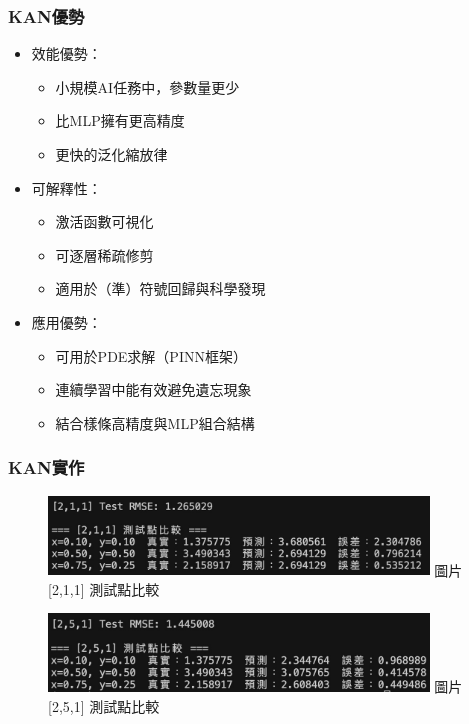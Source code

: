 \documentclass{beamer}
\begin{document}
\begin{frame}
    \frametitle{KAN優勢}
    \begin{itemize}
        \item 效能優勢：
        \begin{itemize}
            \item 小規模AI任務中，參數量更少
            \item 比MLP擁有更高精度
            \item 更快的泛化縮放律
        \end{itemize}
        \item 可解釋性：
        \begin{itemize}
            \item 激活函數可視化
            \item 可逐層稀疏修剪
            \item 適用於（準）符號回歸與科學發現
        \end{itemize}
        \item 應用優勢：
        \begin{itemize}
            \item 可用於PDE求解（PINN框架）
            \item 連續學習中能有效避免遺忘現象
            \item 結合樣條高精度與MLP組合結構
        \end{itemize}
    \end{itemize}
\end{frame}

\begin{frame}
    \frametitle{KAN實作}
    \begin{figure}
        \centering
        \begin{minipage}{\textwidth}
            \includegraphics[width=0.9\textwidth,height=0.4\textheight,keepaspectratio]{figures/211_3.jpg}
            \centering
            圖片[2,1,1] 測試點比較
        \end{minipage}
        
        \vspace{0.5em}
        
        \begin{minipage}{\textwidth}
            \includegraphics[width=0.9\textwidth,height=0.4\textheight,keepaspectratio]{figures/251.jpg}
            \centering
            圖片[2,5,1] 測試點比較
        \end{minipage}
    \end{figure}
\end{frame}
\end{document}

